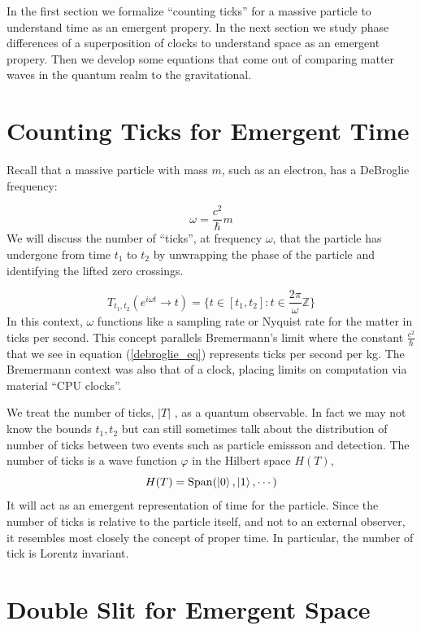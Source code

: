 \documentclass[12pt,a4paper]{article}
\begin{document}
In the first section we formalize ``counting ticks'' for a massive particle to understand time as an emergent propery.  In the next section we study phase differences of a superposition of clocks to understand space as an emergent propery.  Then we develop some equations that come out of comparing matter waves in the quantum realm to the gravitational.

\section{Counting Ticks for Emergent Time}

Recall that a massive particle with mass $m$, such as an electron, has a DeBroglie frequency:

\begin{equation}
\label{debroglie_eq}
\omega = \frac{c^2}{\hslash} m
\end{equation}
We will discuss the number of ``ticks'', at frequency $\omega$, that the particle has undergone from time $t_1$ to $t_2$ by unwrapping the phase of the particle and identifying the lifted zero crossings.

\[
    T_{t_1,t_2}(e^{i \omega t} \rightarrow t) = \{ t \in [t_1,t_2]: t \in \frac{2 \pi}{\omega} \mathbb{Z} \}
\]
In this context, $\omega$ functions like a sampling rate or Nyquist rate for the matter in ticks per second.  This concept parallels Bremermann's limit where the constant $\frac{c^2}{\hslash}$ that we see in equation (\ref{debroglie_eq}) represents ticks per second per kg.  The Bremermann context was also that of a clock, placing limits on computation via material ``CPU clocks''.


We treat the number of ticks, $|T|$ , as a quantum observable.  In fact we may not know the bounds $t_1,t_2$ but can still sometimes talk about the distribution of number of ticks between two events such as particle emissson and detection.  The number of ticks is a wave function $\varphi$ in the Hilbert space $H(T)$,
\[
   H(T) = \mathrm{Span}(\ket{0}, \ket{1}, \cdots)
\]
It will act as an emergent representation of time for the particle. Since the number of ticks is relative to the particle itself, and not to an external observer, it resembles most closely the concept of proper time.  In particular, the number of tick is Lorentz invariant.

\section{Double Slit for Emergent Space}
\end{document}
